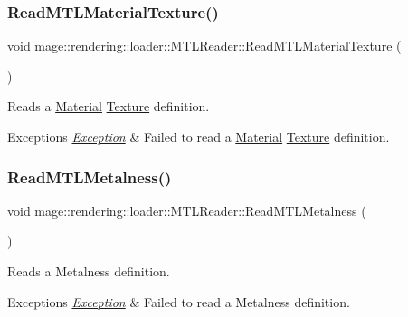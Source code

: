 \subsubsection{\texorpdfstring{Read\+M\+T\+L\+Material\+Texture()}{ReadMTLMaterialTexture()}}
{\footnotesize\ttfamily void mage\+::rendering\+::loader\+::\+M\+T\+L\+Reader\+::\+Read\+M\+T\+L\+Material\+Texture (\begin{DoxyParamCaption}{ }\end{DoxyParamCaption})\hspace{0.3cm}{\ttfamily [private]}}

Reads a \mbox{\hyperlink{classmage_1_1rendering_1_1_material}{Material}} \mbox{\hyperlink{classmage_1_1rendering_1_1_texture}{Texture}} definition.


\begin{DoxyExceptions}{Exceptions}
{\em \mbox{\hyperlink{classmage_1_1_exception}{Exception}}} & Failed to read a \mbox{\hyperlink{classmage_1_1rendering_1_1_material}{Material}} \mbox{\hyperlink{classmage_1_1rendering_1_1_texture}{Texture}} definition. \\
\hline
\end{DoxyExceptions}
\mbox{\label{classmage_1_1rendering_1_1loader_1_1_m_t_l_reader_a14aa8cd5655730234c460c6060552f68}} 
\subsubsection{\texorpdfstring{Read\+M\+T\+L\+Metalness()}{ReadMTLMetalness()}}
{\footnotesize\ttfamily void mage\+::rendering\+::loader\+::\+M\+T\+L\+Reader\+::\+Read\+M\+T\+L\+Metalness (\begin{DoxyParamCaption}{ }\end{DoxyParamCaption})\hspace{0.3cm}{\ttfamily [private]}}

Reads a Metalness definition.


\begin{DoxyExceptions}{Exceptions}
{\em \mbox{\hyperlink{classmage_1_1_exception}{Exception}}} & Failed to read a Metalness definition. \\
\hline
\end{DoxyExceptions}
\mbox{\label{classmage_1_1rendering_1_1loader_1_1_m_t_l_reader_afc25c8d259af6fbeb06a1e189f247e75}} 
